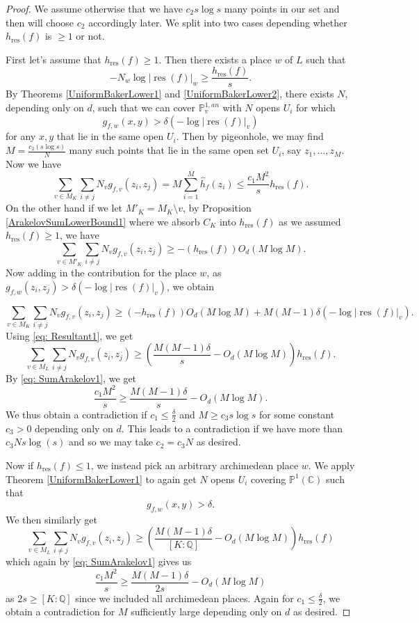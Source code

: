 \documentclass[10pt,a4paper]{amsart}
\newcommand{\bb}{\mathbb}
\newcommand{\berkP}{\mathbb{P}^{1,an}}
\newcommand{\h}{\widehat{h}}
\newcommand{\res}{\operatorname{res}}
\begin{document}
\begin{proof}
We assume otherwise that we have $c_2 s \log s$ many points in our set and then will choose $c_2$ accordingly later. We split into two cases depending whether $h_{\res}(f)$ is $\geq 1$ or not. 
\par 
First let's assume that $h_{\res}(f) \geq 1$. Then there exists a place $w$ of $L$ such that 
\begin{equation} \label{eq: Resultant1}
-N_w \log |\res(f)|_w \geq \frac{h_{\res}(f)}{s}.
\end{equation}
By Theorems \ref{UniformBakerLower1} and \ref{UniformBakerLower2}, there exists $N$, depending only on $d$, such that we can cover $\berkP_v$ with $N$ opens $U_i$ for which 
$$g_{f,w}(x,y) > \delta (-\log |\res(f)|_v)$$
for any $x,y$ that lie in the same open $U_i$. Then by pigeonhole, we may find $M = \frac{c_2 (s \log s)}{N}$ many such points that lie in the same open set $U_i$, say $z_1,\ldots,z_M$. Now we have 
\begin{equation} \label{eq: SumArakelov1}
\sum_{v \in M_K} \sum_{i \not = j} N_v g_{f,v}(z_i,z_j) = M \sum_{i=1}^{M} \h_f(z_i) \leq \frac{c_1 M^2}{s} h_{\res}(f).
\end{equation}
On the other hand if we let $M'_K = M_K \setminus v$, by Proposition \ref{ArakelovSumLowerBound1} where we absorb $C_K$ into $h_{\res}(f)$ as we assumed $h_{\res}(f) \geq 1$, we have 
$$\sum_{v \in M'_K} \sum_{i \not = j} N_v g_{f,v}(z_i,z_j) \geq -(h_{\res}(f)) O_d(M \log M).$$
Now adding in the contribution for the place $w$, as $g_{f,w}(z_i,z_j) > \delta (-\log |\res(f)|_v)$, we obtain 

$$\sum_{v \in M_K} \sum_{i \not = j} N_v g_{f,v}(z_i,z_j) \geq (-h_{\res}(f)) O_d(M \log M) + M(M-1) \delta (-\log |\res(f)|_v).$$
Using \eqref{eq: Resultant1}, we get 
$$\sum_{v \in M_L} \sum_{i \not = j} N_v g_{f,v}(z_i,z_j) \geq \left( \frac{M(M-1) \delta}{s} - O_d(M \log M) \right) h_{\res}(f).$$
By \eqref{eq: SumArakelov1}, we get
$$\frac{c_1 M^2}{s} \geq \frac{M(M-1) \delta }{s} - O_d(M \log M).$$
We thus obtain a contradiction if $c_1 \leq \frac{\delta}{2}$ and $M \geq c_3 s \log s$ for some constant $c_3 > 0$ depending only on $d$. This leads to a contradiction if we have more than $c_3 N s \log (s)$ and so we may take $c_2 = c_3 N$ as desired.
\par 
Now if $h_{\res}(f) \leq 1$, we instead pick an arbitrary archimedean place $w$. We apply Theorem \ref{UniformBakerLower1} to again get $N$ opens $U_i$ covering $\bb{P}^1(\bb{C})$ such that 
$$g_{f,w}(x,y) > \delta.$$
We then similarly get 
$$\sum_{v \in M_L} \sum_{i \not = j} N_v g_{f,v}(z_i,z_j) \geq \left( \frac{M(M-1) \delta}{[K:\bb{Q}]} - O_d(M \log M) \right) h_{\res}(f)$$
which again by \eqref{eq: SumArakelov1} gives us
$$\frac{c_1 M^2}{s} \geq \frac{M(M-1)\delta}{2s}  - O_d(M \log M)$$
as $2s \geq [K:\bb{Q}]$ since we included all archimedean places. Again for $c_1 \leq \frac{\delta}{2}$, we obtain a contradiction for $M$ sufficiently large depending only on $d$ as desired. 

\end{proof}
\end{document}
